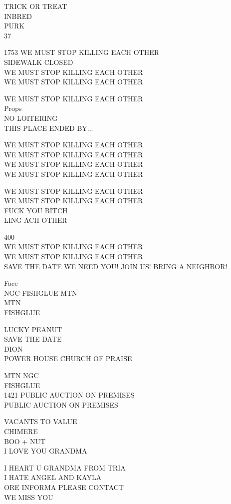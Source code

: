 \documentclass[10pt,letterpaper]{article}
\begin{document}
TRICK OR TREAT\\
INBRED\\
PURK\\
37

1753 WE MUST STOP KILLING EACH OTHER\\
SIDEWALK CLOSED\\
WE MUST STOP KILLING EACH OTHER\\
WE MUST STOP KILLING EACH OTHER

WE MUST STOP KILLING EACH OTHER\\
Props\\
NO LOITERING\\
THIS PLACE ENDED BY...

WE MUST STOP KILLING EACH OTHER\\
WE MUST STOP KILLING EACH OTHER\\
WE MUST STOP KILLING EACH OTHER\\
WE MUST STOP KILLING EACH OTHER

WE MUST STOP KILLING EACH OTHER\\
WE MUST STOP KILLING EACH OTHER\\
FUCK YOU BITCH\\
LING ACH OTHER

400\\
WE MUST STOP KILLING EACH OTHER\\
WE MUST STOP KILLING EACH OTHER\\
SAVE THE DATE WE NEED YOU!  JOIN US!  BRING A NEIGHBOR!

Face\\
NGC FISHGLUE MTN\\
MTN\\
FISHGLUE

LUCKY PEANUT\\
SAVE THE DATE\\
DION\\
POWER HOUSE CHURCH OF PRAISE

MTN NGC\\
FISHGLUE\\
1421 PUBLIC AUCTION ON PREMISES\\
PUBLIC AUCTION ON PREMISES

VACANTS TO VALUE\\
CHIMERE\\
BOO + NUT\\
I LOVE YOU GRANDMA

I HEART U GRANDMA FROM TRIA\\
I HATE ANGEL AND KAYLA\\
ORE INFORMA PLEASE CONTACT\\
WE MISS YOU
\end{document}
